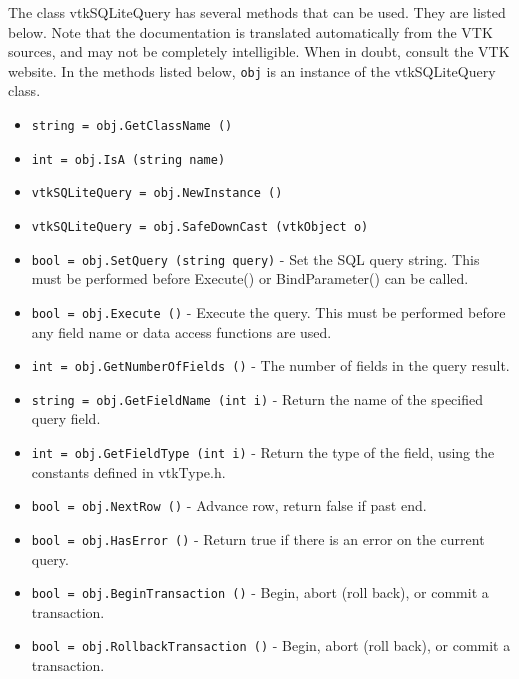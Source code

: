 The class vtkSQLiteQuery has several methods that can be used.
  They are listed below.
Note that the documentation is translated automatically from the VTK sources,
and may not be completely intelligible.  When in doubt, consult the VTK website.
In the methods listed below, \verb|obj| is an instance of the vtkSQLiteQuery class.
\begin{itemize}
\item  \verb|string = obj.GetClassName ()|

\item  \verb|int = obj.IsA (string name)|

\item  \verb|vtkSQLiteQuery = obj.NewInstance ()|

\item  \verb|vtkSQLiteQuery = obj.SafeDownCast (vtkObject o)|

\item  \verb|bool = obj.SetQuery (string query)| -  Set the SQL query string.  This must be performed before
 Execute() or BindParameter() can be called.

\item  \verb|bool = obj.Execute ()| -  Execute the query.  This must be performed
 before any field name or data access functions
 are used.

\item  \verb|int = obj.GetNumberOfFields ()| -  The number of fields in the query result.

\item  \verb|string = obj.GetFieldName (int i)| -  Return the name of the specified query field.

\item  \verb|int = obj.GetFieldType (int i)| -  Return the type of the field, using the constants defined in vtkType.h.

\item  \verb|bool = obj.NextRow ()| -  Advance row, return false if past end.

\item  \verb|bool = obj.HasError ()| -  Return true if there is an error on the current query.

\item  \verb|bool = obj.BeginTransaction ()| -  Begin, abort (roll back), or commit a transaction.

\item  \verb|bool = obj.RollbackTransaction ()| -  Begin, abort (roll back), or commit a transaction.


\end{itemize}
